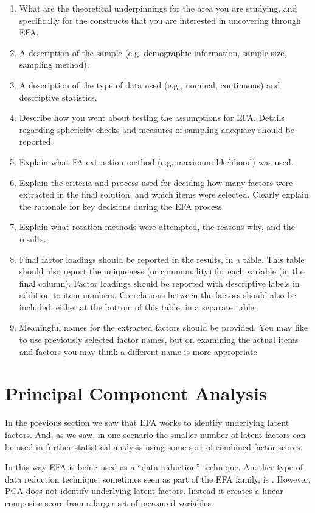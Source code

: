 \begin{enumerate} \itemsep -2pt
\item What are the theoretical underpinnings for the area you are studying, and specifically for the constructs that you are interested in uncovering through EFA. 
\item A description of the sample (e.g. demographic information, sample size, sampling method).
\item A description of the type of data used (e.g., nominal, continuous) and descriptive statistics.
\item Describe how you went about testing the assumptions for EFA. Details regarding sphericity checks and measures of sampling adequacy should be reported. 
\item Explain what FA extraction method (e.g. maximum likelihood) was used. 
\item Explain the criteria and process used for deciding how many factors were extracted in the final solution, and which items were selected. Clearly explain the rationale for key decisions during the EFA process.
\item Explain what rotation methods were attempted, the reasons why, and the results. 
\item Final factor loadings should be reported in the results, in a table. This table should also report the uniqueness (or communality) for each variable (in the final column). Factor loadings should be reported with descriptive labels in addition to item numbers. Correlations between the factors should also be included, either at the bottom of this table, in a separate table.
\item Meaningful names for the extracted factors should be provided. You may like to use previously selected factor names, but on examining the actual items and factors you may think a different name is more appropriate
\end{enumerate}


\section{Principal Component Analysis~\label{sec:PCA}}

In the previous section we saw that EFA works to identify underlying latent factors. And, as we saw, in one scenario the smaller number of latent factors can be used in further statistical analysis using some sort of combined factor scores.

In this way EFA is being used as a “data reduction” technique. Another type of data reduction technique, sometimes seen as part of the EFA family, is . However, PCA does not identify underlying latent factors. Instead it creates a linear composite score from a larger set of measured variables. 

